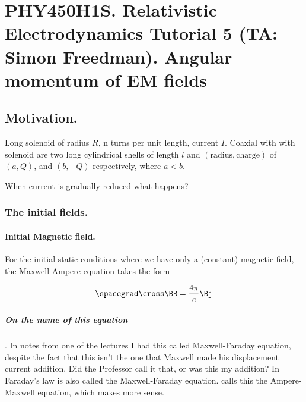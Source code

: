
%

\chapter{PHY450H1S.  Relativistic Electrodynamics Tutorial 5 (TA: Simon Freedman).  Angular momentum of EM fields}
\label{chap:relativisticElectrodynamicsT5}
{}
\date{Mar 10, 2011}

\beginArtWithToc

\section{Motivation.}

Long solenoid of radius $R$, n turns per unit length, current $I$.  Coaxial with with solenoid are two long cylindrical shells of length $l$ and $(\text{radius},\text{charge})$ of $(a, Q)$, and $(b, -Q)$ respectively, where $a < b$.

When current is gradually reduced what happens?

\subsection{The initial fields.}
\subsubsection{Initial Magnetic field.}

For the initial static conditions where we have only a (constant) magnetic field, the Maxwell-Ampere equation takes the form

\begin{equation}\label{eqn:relativisticElectrodynamicsT5:10}
\spacegrad \cross \BB = \frac{4 \pi}{c} \Bj
\end{equation}

\paragraph{On the name of this equation}.  In notes from one of the lectures I had this called Maxwell-Faraday equation, despite the fact that this isn't the one that Maxwell made his displacement current addition.  Did the Professor call it that, or was this my addition?  In \cite{wiki:Faraday} Faraday's law is also called the Maxwell-Faraday equation.  \cite{fleisch2007ssg} calls this the Ampere-Maxwell equation, which makes more sense.

